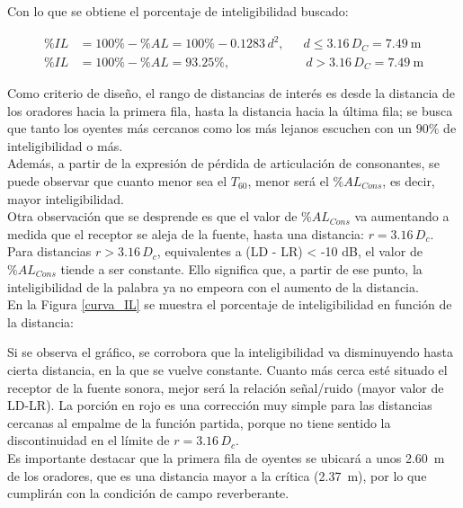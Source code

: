 
	Con lo que se obtiene el porcentaje de inteligibilidad buscado:

	\begin{align*}
		\% IL &= 100\% - \% AL = 100\% - 0.1283\,d^2, \,\,\,\quad d \leq 3.16\,D_C = \SI{7.49}{\m}\\
		\% IL &= 100\% - \% AL = 93.25\%, \qquad\qquad\qquad d > 3.16\, D_C = \SI{7.49}{\m}
	\end{align*}
	
	
	Como criterio de diseño, el rango de distancias de interés es desde la distancia de los oradores hacia la primera fila, hasta la distancia hacia la última fila; se busca que tanto los oyentes más cercanos como los más lejanos escuchen con un $90\%$ de inteligibilidad o más.\\
	
	Además, a partir de la expresión de pérdida de articulación de consonantes, se puede observar que cuanto menor sea el $T_{60}$, menor será el $\%AL_{Cons}$, es decir, mayor inteligibilidad.\\
	
	Otra observación que se desprende es que el valor de $\%AL_{Cons}$ va aumentando a medida que el receptor se aleja de la fuente, hasta una distancia: $r = 3.16\,D_c$. Para distancias $r > 3.16\,D_c$, equivalentes a (LD - LR) < -10 dB, el valor de $\%AL_{Cons}$ tiende a ser constante. Ello significa que, a partir de ese punto, la inteligibilidad de la palabra ya no empeora con el aumento de la distancia.\\
	
	En la Figura \ref{curva_IL} se muestra el porcentaje de inteligibilidad en función de la distancia:
	
	
	Si se observa el gráfico, se corrobora que la inteligibilidad va disminuyendo hasta cierta distancia, en la que se vuelve constante. Cuanto más cerca esté situado el receptor de la fuente sonora, mejor será la relación señal/ruido (mayor valor de LD-LR). La porción en rojo es una corrección muy simple para las distancias cercanas al empalme de la función partida, porque no tiene sentido la discontinuidad en el límite de $r = 3.16\,D_c$.\\
	
	Es importante destacar que la primera fila de oyentes se ubicará a unos \SI{2.60}{\m} de los oradores, que es una distancia mayor a la crítica (\SI{2.37}{\m}), por lo que cumplirán con la condición de campo reverberante.